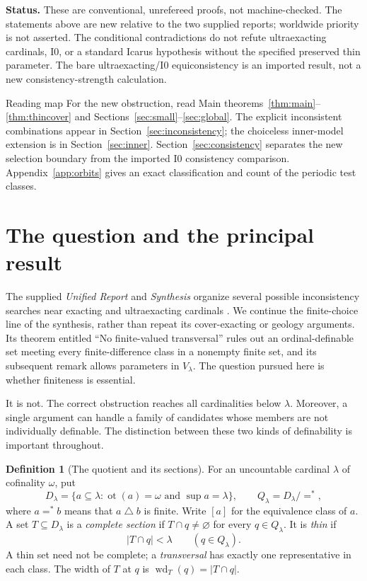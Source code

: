 \documentclass[11pt,letterpaper]{article}
\theoremstyle{definition}
\newtheorem{definition}{Definition}[section]
\numberwithin{equation}{section}
\newcommand{\ot}{\operatorname{ot}}
\newcommand{\Izero}{\mathrm{I0}}
\newcommand{\symdiff}{\mathbin{\triangle}}
\newcommand{\eqfin}{\mathrel{=^{*}}}
\newcommand{\width}{\operatorname{wd}}
\begin{document}
\textbf{Status.}
These are conventional, unrefereed proofs, not machine-checked. The statements above are new relative to the two supplied reports; worldwide priority is not asserted. The conditional contradictions do not refute ultraexacting cardinals, $\Izero$, or a standard Icarus hypothesis without the specified preserved thin parameter. The bare ultraexacting/$\Izero$ equiconsistency is an imported result, not a new consistency-strength calculation.

\newpage
\tableofcontents
\vspace{8pt}
\begin{assessment}{Reading map}
For the new obstruction, read Main theorems~\ref{thm:main}--\ref{thm:thincover} and Sections~\ref{sec:small}--\ref{sec:global}. The explicit inconsistent combinations appear in Section~\ref{sec:inconsistency}; the choiceless inner-model extension is in Section~\ref{sec:inner}. Section~\ref{sec:consistency} separates the new selection boundary from the imported $\Izero$ consistency comparison. Appendix~\ref{app:orbits} gives an exact classification and count of the periodic test classes.
\end{assessment}

\newpage
\section{The question and the principal result}\label{sec:main}

The supplied \emph{Unified Report} and \emph{Synthesis} organize several possible inconsistency searches near exacting and ultraexacting cardinals \cite{Unified,Synthesis}. We continue the finite-choice line of the synthesis, rather than repeat its cover-exacting or geology arguments. Its theorem entitled ``No finite-valued transversal'' rules out an ordinal-definable set meeting every finite-difference class in a nonempty finite set, and its subsequent remark allows parameters in $V_\lambda$. The question pursued here is whether finiteness is essential.

It is not. The correct obstruction reaches all cardinalities below $\lambda$. Moreover, a single argument can handle a family of candidates whose members are not individually definable. The distinction between these two kinds of definability is important throughout.

\begin{definition}[The quotient and its sections]\label{def:quotient}
For an uncountable cardinal $\lambda$ of cofinality $\omega$, put
\[
 D_\lambda=\{a\subseteq\lambda:\ot(a)=\omega\text{ and }\sup a=\lambda\},
 \qquad Q_\lambda=D_\lambda/\eqfin,
\]
where $a\eqfin b$ means that $a\symdiff b$ is finite. Write $[a]$ for the equivalence class of $a$. A set $T\subseteq D_\lambda$ is a \emph{complete section} if $T\cap q\ne\varnothing$ for every $q\in Q_\lambda$. It is \emph{thin} if
\[
 |T\cap q|<\lambda\qquad(q\in Q_\lambda).
\]
A thin set need not be complete; a \emph{transversal} has exactly one representative in each class. The width of $T$ at $q$ is $\width_T(q)=|T\cap q|$.
\end{definition}
\end{document}
